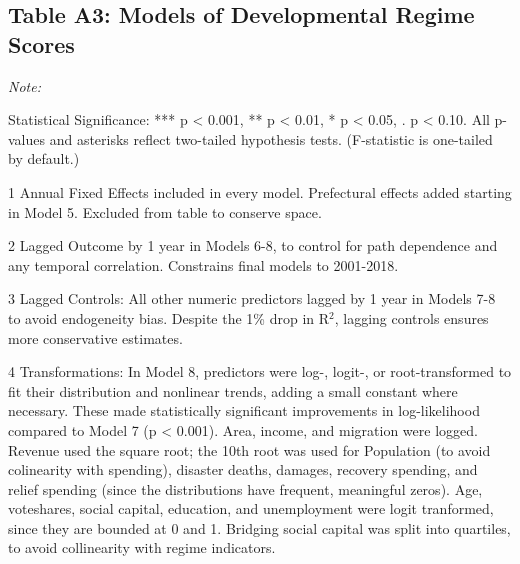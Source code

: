 \documentclass[preprint, 3p,
authoryear]{elsarticle} %
\begin{document}
\hypertarget{table-a3-models-of-developmental-regime-scores}{%
\subsection{Table A3: Models of Developmental Regime
Scores}\label{table-a3-models-of-developmental-regime-scores}}

\begin{landscape}
\renewcommand{\baselinestretch}{0.5}\selectfont
\renewcommand{\arraystretch}{1.5}

\begingroup\fontsize{10}{12}\selectfont

\begin{ThreePartTable}
\begin{TableNotes}
\item \textit{Note: } 
\item Statistical Significance: *** p < 0.001, ** p < 0.01, * p < 0.05, . p < 0.10. All p-values and asterisks reflect two-tailed hypothesis tests. (F-statistic is one-tailed by default.)
\item[1] Annual Fixed Effects included in every model. Prefectural effects added starting in Model 5. Excluded from table to conserve space.
\item[2] Lagged Outcome by 1 year in Models 6-8, to control for path dependence and any temporal correlation. Constrains final models to 2001-2018.
\item[3] Lagged Controls: All other numeric predictors lagged by 1 year in Models 7-8 to avoid endogeneity bias. Despite the 1\% drop in R$^{2}$, lagging controls ensures more conservative estimates.
\item[4] Transformations: In Model 8, predictors were log-, logit-, or root-transformed to fit their distribution and nonlinear trends, adding a small constant where necessary. These made statistically significant improvements in log-likelihood compared to Model 7 (p < 0.001). Area, income, and migration were logged. Revenue used the square root; the 10th root was used for Population (to avoid colinearity with spending), disaster deaths, damages, recovery spending, and relief spending (since the distributions have frequent, meaningful zeros). Age, voteshares, social capital, education, and unemployment were logit tranformed, since they are bounded at 0 and 1. Bridging social capital was split into quartiles, to avoid collinearity with regime indicators.
\end{TableNotes}
\begin{longtabu} to 

\end{longtabu}
\end{ThreePartTable}
\end{landscape}
\end{document}
